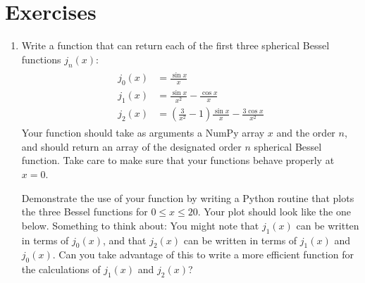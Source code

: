 \documentclass[letterpaper,10pt,english]{sphinxmanual}
\begin{document}
\section{Exercises}
\label{chap7/chap7_funcs:exercises}\begin{enumerate}
\item {} 
Write a function that can return each of the first three spherical Bessel functions $j_n(x)$:
\label{chap7/chap7_funcs:equation-eq:bessel}\begin{gather}
\begin{split}j_0(x) &= \frac{\sin x}{x}\\
j_1(x) &= \frac{\sin x}{x^2} - \frac{\cos x}{x}\\
j_2(x) &= \left(\frac{3}{x^2}-1\right)\frac{\sin x}{x} - \frac{3\cos x}{x^2}\end{split}\label{chap7/chap7_funcs-eq:bessel}
\end{gather}
Your function should take as arguments a NumPy array $x$ and the order $n$, and should return an array of the designated order $n$ spherical Bessel function.  Take care to make sure that your functions behave properly at $x=0$.

Demonstrate the use of your function by writing a Python routine that plots the three Bessel functions for $0 \le x \le 20$.  Your plot should look like the one below.  Something to think about: You might note that $j_1(x)$ can be written in terms of $j_0(x)$, and that $j_2(x)$ can be written in terms of $j_1(x)$ and $j_0(x)$.  Can you take advantage of this to write a more efficient function for the calculations of $j_1(x)$ and $j_2(x)$?
\begin{figure}[htbp]
\centering

\label{chap7/chap7_funcs:fig-besselsph}\end{figure}


\end{enumerate}
\end{document}
